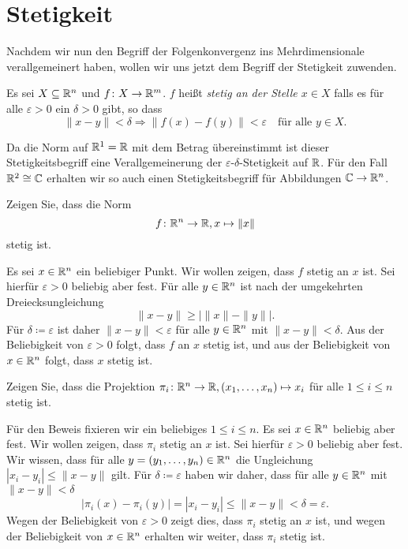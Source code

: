 \documentclass[a4paper,10pt]{article}
\begin{document}
\section{Stetigkeit}


Nachdem wir nun den Begriff der Folgenkonvergenz ins Mehrdimensionale verallgemeinert haben, wollen wir uns jetzt dem Begriff der Stetigkeit zuwenden.


\begin{defi}
 Es sei $X \subseteq \mathbb{R}^n$ und $f \colon X \to \mathbb{R}^m$. $f$ heißt \emph{stetig an der Stelle $x \in X$} falls es für alle $\varepsilon > 0$ ein $\delta > 0$ gibt, so dass
 \[
  \|x-y\| < \delta \Rightarrow \|f(x)-f(y)\| < \varepsilon \quad \text{für alle $y \in X$}.
 \]
\end{defi}


Da die Norm auf $\mathbb{R}^1 = \mathbb{R}$ mit dem Betrag übereinstimmt ist dieser Stetigkeitsbegriff eine Verallgemeinerung der $\varepsilon$-$\delta$-Stetigkeit auf $\mathbb{R}$. Für den Fall $\mathbb{R}^2 \cong \mathbb{C}$ erhalten wir so auch einen Stetigkeitsbegriff für Abbildungen $\mathbb{C} \to \mathbb{R}^n$.


\begin{question}
 Zeigen Sie, dass die Norm
 \[
  f \colon \mathbb{R}^n \to \mathbb{R}, x \mapsto \|x\|
 \]
 stetig ist.
\end{question}
\begin{solution}
 Es sei $x \in \mathbb{R}^n$ ein beliebiger Punkt. Wir wollen zeigen, dass $f$ stetig an $x$ ist. Sei hierfür $\varepsilon > 0$ beliebig aber fest. Für alle $y \in \mathbb{R}^n$ ist nach der umgekehrten Dreiecksungleichung
 \[
  \|x-y\| \geq |\|x\|-\|y\||.
 \]
 Für $\delta \coloneqq \varepsilon$ ist daher $\|x-y\| < \varepsilon$ für alle $y \in \mathbb{R}^n$ mit $\|x-y\| < \delta$. Aus der Beliebigkeit von $\varepsilon > 0$ folgt, dass $f$ an $x$ stetig ist, und aus der Beliebigkeit von $x \in \mathbb{R}^n$ folgt, dass $x$ stetig ist.
\end{solution}


\begin{question}
 Zeigen Sie, dass die Projektion $\pi_i \colon \mathbb{R}^n \to \mathbb{R}, (x_1, \dotsc, x_n) \mapsto x_i$ für alle $1 \leq i \leq n$ stetig ist.
\end{question}
\begin{solution}
 Für den Beweis fixieren wir ein beliebiges $1 \leq i \leq n$. Es sei $x \in \mathbb{R}^n$ beliebig aber fest. Wir wollen zeigen, dass $\pi_i$ stetig an $x$ ist. Sei hierfür $\varepsilon > 0$ beliebig aber fest. Wir wissen, dass für alle $y = (y_1, \dotsc, y_n) \in \mathbb{R}^n$ die Ungleichung $|x_i - y_i| \leq \|x-y\|$ gilt. Für $\delta \coloneqq \varepsilon$ haben wir daher, dass für alle $y \in \mathbb{R}^n$ mit $\|x-y\| < \delta$
 \[
  |\pi_i(x)-\pi_i(y)| = |x_i - y_i| \leq \|x-y\| < \delta = \varepsilon.
 \]
 Wegen der Beliebigkeit von $\varepsilon > 0$ zeigt dies, dass $\pi_i$ stetig an $x$ ist, und wegen der Beliebigkeit von $x \in \mathbb{R}^n$ erhalten wir weiter, dass $\pi_i$ stetig ist.
\end{solution}
\end{document}
